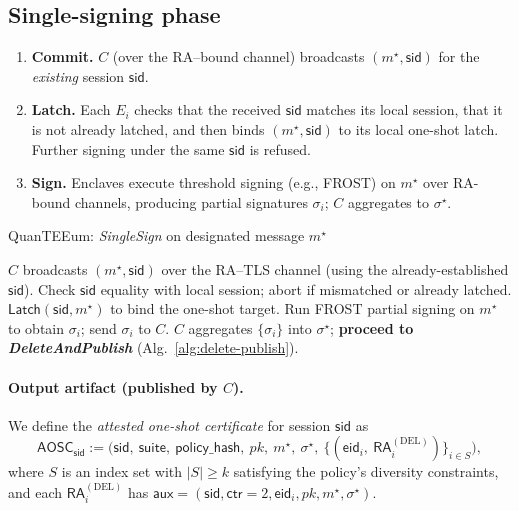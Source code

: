 \documentclass[runningheads,orivec]{llncs}
\newcommand{\prot}{\textsf{QuanTEEum}}
\newcommand{\sid}{\mathsf{sid}}
\newcommand{\FROST}{\textsf{FROST}}
\begin{document}
\subsection{Single-signing phase}
\begin{enumerate}[leftmargin=*,itemsep=0.25em]
  \item \textbf{Commit.} $C$ (over the RA–bound channel) broadcasts $(m^{\star},\mathsf{sid})$ for the \emph{existing} session $\mathsf{sid}$.
  \item \textbf{Latch.} Each $E_i$ checks that the received $\mathsf{sid}$ matches its local session, that it is not already latched, and then binds $(m^{\star},\mathsf{sid})$ to its local one-shot latch. Further signing under the same $\mathsf{sid}$ is refused.
  \item \textbf{Sign.} Enclaves execute threshold signing (e.g., \FROST{}) on $m^{\star}$ over RA-bound channels, producing partial signatures $\sigma_i$; $C$ aggregates to $\sigma^{\star}$.
\end{enumerate}

\begin{algorithm}[!htbp]
\caption{\prot{}: \emph{SingleSign} on designated message $m^{\star}$}
\label{alg:sign}
\begin{small}
\begin{algorithmic}[1]
\State $C$ broadcasts $(m^{\star},\mathsf{sid})$ over the RA–TLS channel (using the already-established $\mathsf{sid}$).
  \State Check $\mathsf{sid}$ equality with local session; abort if mismatched or already latched.
  \State $\textsf{Latch}(\mathsf{sid},m^{\star})$ to bind the one-shot target.
  \State Run \FROST{} partial signing on $m^{\star}$ to obtain $\sigma_i$; send $\sigma_i$ to $C$.
\EndFor
\State $C$ aggregates $\{\sigma_i\}$ into $\sigma^{\star}$; \textbf{proceed to \emph{DeleteAndPublish}} (Alg.~\ref{alg:delete-publish}).
\end{algorithmic}
\end{small}
\end{algorithm}

\paragraph{Output artifact (published by $C$).}
We define the \emph{attested one-shot certificate} for session $\sid$ as
\[
\mathsf{AOSC}_\sid := \big(\sid,\ \mathsf{suite},\ \mathsf{policy\_hash},\ pk,\ m^{\star},\ \sigma^{\star},\ \{(\mathsf{eid}_i,\ \mathsf{RA}^{(\mathrm{DEL})}_i)\}_{i\in S}\big),
\]
where $S$ is an index set with $|S|\ge k$ satisfying the policy’s diversity constraints, and each
$\mathsf{RA}^{(\mathrm{DEL})}_i$ has $\mathsf{aux}=(\sid,\mathsf{ctr}{=}2,\mathsf{eid}_i,pk,m^{\star},\sigma^{\star})$.
\end{document}

